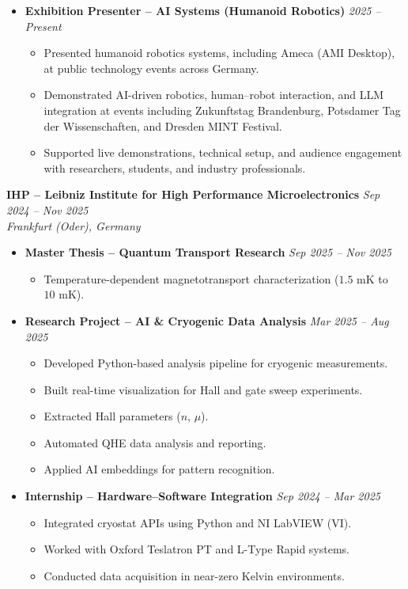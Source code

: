 \documentclass[10pt, a4paper]{article}
\begin{document}
\begin{itemize}
  \item \textbf{Exhibition Presenter – AI Systems (Humanoid Robotics)} \hfill \textit{2025 -- Present}
  \begin{itemize}[leftmargin=1.2em, itemsep=1.5pt]
    \item Presented humanoid robotics systems, including Ameca (AMI Desktop), at public technology events across Germany.
    \item Demonstrated AI-driven robotics, human--robot interaction, and LLM integration at events including Zukunftstag Brandenburg, Potsdamer Tag der Wissenschaften, and Dresden MINT Festival.
    \item Supported live demonstrations, technical setup, and audience engagement with researchers, students, and industry professionals.
  \end{itemize}
\end{itemize}

\vspace{0.4em}

\textbf{IHP – Leibniz Institute for High Performance Microelectronics} \hfill \textit{Sep 2024 -- Nov 2025} \\
\textit{Frankfurt (Oder), Germany}

\begin{itemize}
  \item \textbf{Master Thesis – Quantum Transport Research} \hfill \textit{Sep 2025 -- Nov 2025}
  \begin{itemize}[leftmargin=1.2em]
    \item Temperature-dependent magnetotransport characterization ($1.5\text{ mK}$ to $10\text{ mK}$).
  \end{itemize}

  \item \textbf{Research Project – AI \& Cryogenic Data Analysis} \hfill \textit{Mar 2025 -- Aug 2025}
  \begin{itemize}[leftmargin=1.2em, itemsep=1.5pt]
    \item Developed Python-based analysis pipeline for cryogenic measurements.
    \item Built real-time visualization for Hall and gate sweep experiments.
    \item Extracted Hall parameters ($n$, $\mu$).
    \item Automated QHE data analysis and reporting.
    \item Applied AI embeddings for pattern recognition.
  \end{itemize}

  \item \textbf{Internship – Hardware--Software Integration} \hfill \textit{Sep 2024 -- Mar 2025}
  \begin{itemize}[leftmargin=1.2em]
    \item Integrated cryostat APIs using Python and NI LabVIEW (VI).
    \item Worked with Oxford Teslatron PT and L-Type Rapid systems.
    \item Conducted data acquisition in near-zero Kelvin environments.
  \end{itemize}
\end{itemize}
\end{document}
